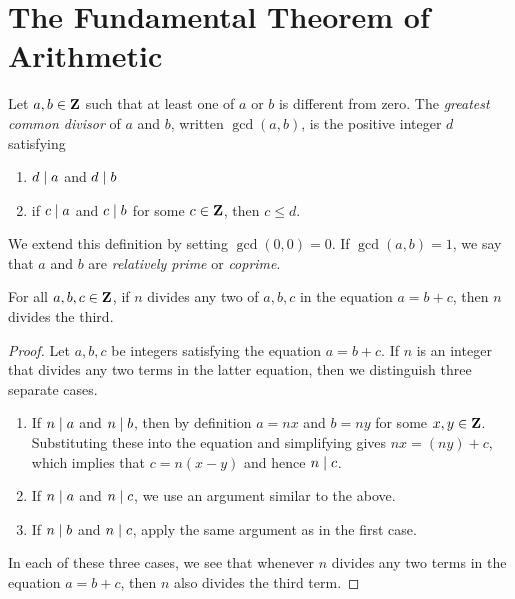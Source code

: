 \section{The Fundamental Theorem of Arithmetic}

Let $a,b \in \mathbf{Z}$ such that at least one of $a$ or $b$ is different
from zero. The
\emph{greatest common divisor} of $a$
and $b$, written $\gcd(a,b)$\index{$\gcd$}, is the positive integer
$d$ satisfying
%
\begin{enumerate}
\item $d \;|\; a$ and $d \;|\; b$

\item if $c \;|\; a$ and $c \;|\; b$ for some $c \in \mathbf{Z}$, then $c
  \leq d$.
\end{enumerate}
%
We extend this definition by setting $\gcd(0,0) = 0$. If
$\gcd(a,b) = 1$, we say that $a$ and $b$ are
\emph{relatively prime} or
\emph{coprime}.

\begin{theorem}
\label{thm:unique_factorization:divides_any_two_terms_then_divides_third}
For all $a,b,c \in \mathbf{Z}$, if $n$ divides any two of $a,b,c$ in
the equation $a = b + c$, then $n$ divides the third.
\end{theorem}

\begin{proof}
Let $a,b,c$ be integers satisfying the equation $a = b + c$. If
$n$ is an integer that divides any two terms in the latter equation, then
we distinguish three separate cases.
%
\begin{enumerate}
\item If $n \;|\; a$ and $n \;|\; b$, then by definition $a = nx$ and
  $b = ny$ for some $x,y \in \mathbf{Z}$. Substituting these into the
  equation and simplifying gives $nx = (ny) + c$, which implies that
  $c = n(x - y)$ and hence $n \;|\; c$.

\item If $n \;|\; a$ and $n \;|\; c$, we use an argument similar to
  the above.

\item If $n \;|\; b$ and $n \;|\; c$, apply the same argument as in
  the first case.
\end{enumerate}
%
In each of these three cases, we see that whenever $n$ divides any
two terms in the equation $a = b + c$, then $n$ also divides the
third term.
\end{proof}

